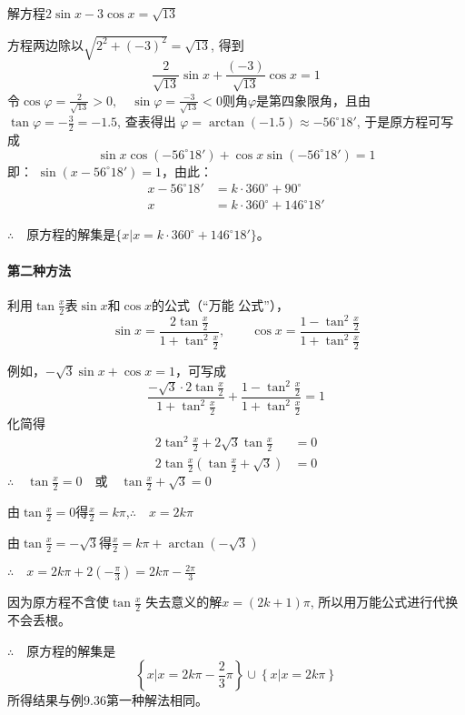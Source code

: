 \begin{example}
    解方程$2\sin x-3\cos x =\sqrt{13}$
\end{example}

\begin{solution}
方程两边除以$\sqrt{2^2+(-3)^2}=\sqrt{13}$, 得到
\[\frac{2}{\sqrt{13}}\sin x+\frac{(-3)}{\sqrt{13}}\cos x=1\]
令$\cos\varphi=\frac{2}{\sqrt{13}}>0,\quad \sin\varphi=\frac{-3}{\sqrt{13}}<0$则角$\varphi$是第四象限角，且由$\tan \varphi=-\frac{3}{2}=-1.5$, 查表得出
$\varphi=\arctan (-1.5)\approx -56^{\circ}18'$, 于是原方程可写成
\[\sin x\cos(-56^{\circ}18')+\cos x\sin(-56^{\circ}18')=1\]
即：
$\sin(x-56^{\circ}18')=1$，由此：
\[\begin{split}
   x- 56^{\circ}18'&=k\cdot 360^{\circ}+90^{\circ}\\
x&=k\cdot 360^{\circ}+146^{\circ}18'
\end{split}\]

$\therefore\quad $原方程的解集是$\{x\big|x=k\cdot 360^{\circ}+146^{\circ}18'\}$。
\end{solution}

\paragraph{第二种方法} 
利用$\tan\frac{x}{2}$表$\sin x$和$\cos x$的公式（“万能
公式”），
\[\sin x=\frac{2\tan\frac{x}{2}}{1+\tan^2\frac{x}{2}},\qquad \cos x=\frac{1-\tan^2\frac{x}{2}}{1+\tan^2\frac{x}{2}}\]

例如，$-\sqrt{3}\sin x+\cos x=1 $，可写成
\[\frac{-\sqrt{3}\cdot 2\tan\frac{x}{2}}{1+\tan^2\frac{x}{2}}+\frac{1-\tan^2\frac{x}{2}}{1+\tan^2\frac{x}{2}}=1\]
化简得
\[\begin{split}
    2\tan^2\frac{x}{2}+2\sqrt{3}\tan\frac{x}{2}&=0\\
    2\tan\frac{x}{2}\left(\tan\frac{x}{2}+\sqrt{3}\right)&=0
\end{split} 
   \]
$\therefore\quad \tan\frac{x}{2}=0\quad \text{或}\quad \tan\frac{x}{2}+\sqrt{3}=0$

由$\tan\frac{x}{2}=0$得$\frac{x}{2}=k\pi$,\quad $\therefore\quad x=2k\pi$

由$\tan\frac{x}{2}=-\sqrt{3}$得$\frac{x}{2}=k\pi+\arctan(-\sqrt{3})$

$\therefore\quad x=2k\pi+2\left(-\frac{\pi}{3}\right)=2k\pi-\frac{2\pi}{3}$

因为原方程不含使$\tan\frac{x}{2}$
失去意义的解$x=(2k+1)\pi$, 所以用万能公式进行代换不会丢根。

$\therefore\quad $原方程的解集是
\[\left\{x\big|x=2k\pi-\frac{2}{3}\pi\right\}\cup \left\{x\big|x=2k\pi\right\}\]
所得结果与例9.36第一种解法相同。

